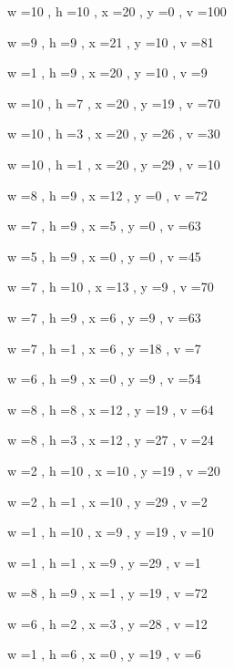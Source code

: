 \documentclass[11pt]{article}
\begin{document}
w =10 , h =10 , x =20 , y =0 , v =100
\par
w =9 , h =9 , x =21 , y =10 , v =81
\par
w =1 , h =9 , x =20 , y =10 , v =9
\par
w =10 , h =7 , x =20 , y =19 , v =70
\par
w =10 , h =3 , x =20 , y =26 , v =30
\par
w =10 , h =1 , x =20 , y =29 , v =10
\par
w =8 , h =9 , x =12 , y =0 , v =72
\par
w =7 , h =9 , x =5 , y =0 , v =63
\par
w =5 , h =9 , x =0 , y =0 , v =45
\par
w =7 , h =10 , x =13 , y =9 , v =70
\par
w =7 , h =9 , x =6 , y =9 , v =63
\par
w =7 , h =1 , x =6 , y =18 , v =7
\par
w =6 , h =9 , x =0 , y =9 , v =54
\par
w =8 , h =8 , x =12 , y =19 , v =64
\par
w =8 , h =3 , x =12 , y =27 , v =24
\par
w =2 , h =10 , x =10 , y =19 , v =20
\par
w =2 , h =1 , x =10 , y =29 , v =2
\par
w =1 , h =10 , x =9 , y =19 , v =10
\par
w =1 , h =1 , x =9 , y =29 , v =1
\par
w =8 , h =9 , x =1 , y =19 , v =72
\par
w =6 , h =2 , x =3 , y =28 , v =12
\par
w =1 , h =6 , x =0 , y =19 , v =6
\par
\newpage


\end{document}

